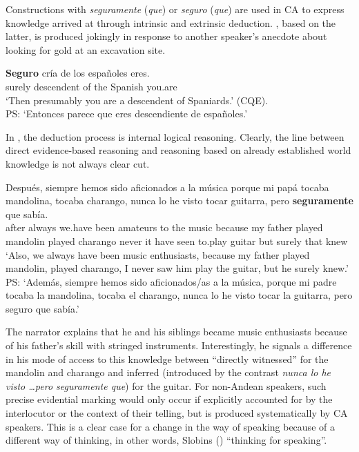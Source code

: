 \documentclass[output=paper,hidelinks]{langscibook}
\begin{document}
Constructions with \textit{seguramente} (\textit{que}) or \textit{seguro} (\textit{que}) are used in CA to express knowledge arrived at through intrinsic and extrinsic deduction. , based on the latter, is produced jokingly in response to another speaker's anecdote about looking for gold at an excavation site.

\ea \label{ex:criadelos}
\gll \textbf{Seguro} cría de los españoles eres. \\
surely descendent of the Spanish you.are \\ \glt ‘Then presumably you are a descendent of Spaniards.' (CQE).\\
PS: `Entonces parece que eres descendiente de españoles.'
\z

In , the deduction process is internal logical reasoning. Clearly, the line between direct evidence-based reasoning and reasoning based on already established world knowledge is not always clear cut.

\ea \label{ex:mandolin}
\gll Después, siempre hemos sido aficionados a la música porque mi papá tocaba mandolina, tocaba charango, nunca lo he visto tocar guitarra, pero \textbf{seguramente} que sabía. \\
after always we.have been amateurs to the music because my father played mandolin played charango never it have seen to.play guitar but surely that knew\\ 
\glt `Also, we always have been music enthusiasts, because my father played mandolin, played charango, I never saw him play the guitar, but he surely knew.' \citep[107]{dankelpagel2012}\\
PS: `Además, siempre hemos sido aficionados/as a la música, porque mi padre tocaba la mandolina, tocaba el charango, nunca lo he visto tocar la guitarra, pero seguro que sabía.'
\z

The narrator explains that he and his siblings became music enthusiasts because of his father’s skill with stringed instruments. Interestingly, he signals a difference in his mode of access to this knowledge between ``directly witnessed'' for the mandolin and charango and inferred (introduced by the contrast \textit{nunca lo he visto \ldots pero seguramente que}) for the guitar. For non-Andean speakers, such precise evidential marking would only occur if explicitly accounted for by the interlocutor or the context of their telling, but is produced systematically by CA speakers. This is a clear case for a change in the way of speaking because of a different way of thinking, in other words, Slobins (\citeyear{slobin2016thinking}) “thinking for speaking”.
\end{document}

